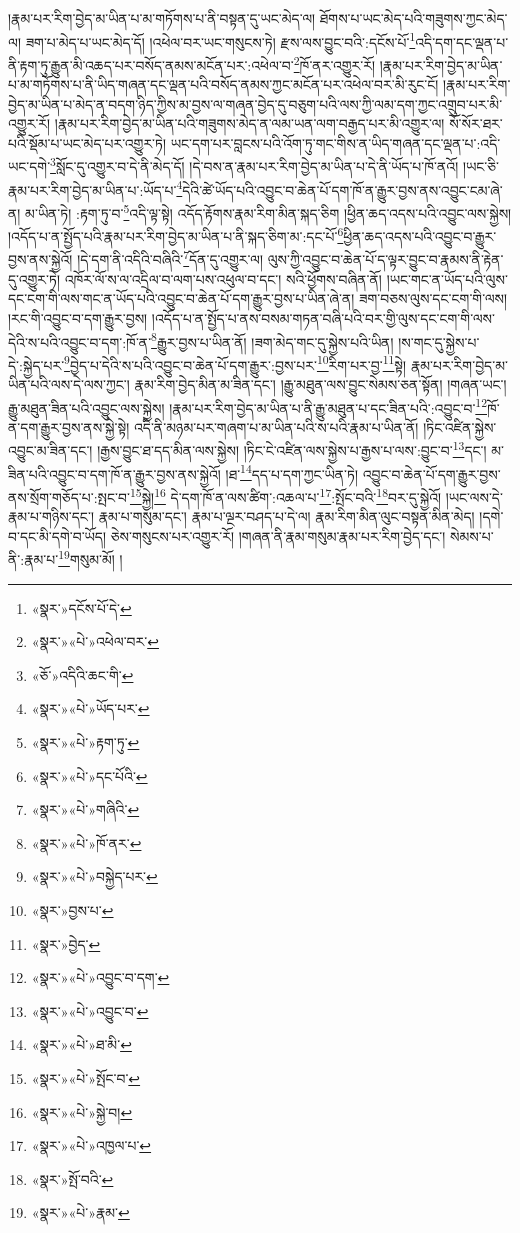 །རྣམ་པར་རིག་བྱེད་མ་ཡིན་པ་མ་གཏོགས་པ་ནི་བསྟན་དུ་ཡང་མེད་ལ། ཐོགས་པ་ཡང་མེད་པའི་གཟུགས་ཀྱང་མེད་ལ། ཟག་པ་མེད་པ་ཡང་མེད་དོ། །འཕེལ་བར་ཡང་གསུངས་ཏེ། རྫས་ལས་བྱུང་བའི་:དངོས་པོ་\footnote{«སྣར་»དངོས་པོ་དེ་}འདི་དག་དང་ལྡན་པ་ནི་རྟག་ཏུ་རྒྱུན་མི་འཆད་པར་བསོད་ནམས་མངོན་པར་:འཕེལ་བ་\footnote{«སྣར་»«པེ་»འཕེལ་བར་}ཁོ་ནར་འགྱུར་རོ། །རྣམ་པར་རིག་བྱེད་མ་ཡིན་པ་མ་གཏོགས་པ་ནི་ཡིད་གཞན་དང་ལྡན་པའི་བསོད་ནམས་ཀྱང་མངོན་པར་འཕེལ་བར་མི་རུང་ངོ། །རྣམ་པར་རིག་བྱེད་མ་ཡིན་པ་མེད་ན་བདག་ཉིད་ཀྱིས་མ་བྱས་ལ་གཞན་བྱེད་དུ་བཅུག་པའི་ལས་ཀྱི་ལམ་དག་ཀྱང་འགྲུབ་པར་མི་འགྱུར་རོ། །རྣམ་པར་རིག་བྱེད་མ་ཡིན་པའི་གཟུགས་མེད་ན་ལམ་ཡན་ལག་བརྒྱད་པར་མི་འགྱུར་ལ། སོ་སོར་ཐར་པའི་སྡོམ་པ་ཡང་མེད་པར་འགྱུར་ཏེ། ཡང་དག་པར་བླངས་པའི་འོག་ཏུ་གང་གིས་ན་ཡིད་གཞན་དང་ལྡན་པ་:འདི་ཡང་དགེ་\footnote{«ཅོ་»འདིའི་ཆང་གི་}སློང་དུ་འགྱུར་བ་དེ་ནི་མེད་དོ། །དེ་བས་ན་རྣམ་པར་རིག་བྱེད་མ་ཡིན་པ་དེ་ནི་ཡོད་པ་ཁོ་ནའོ། །ཡང་ཅི་རྣམ་པར་རིག་བྱེད་མ་ཡིན་པ་:ཡོད་པ་\footnote{«སྣར་»«པེ་»ཡོད་པར་}དེའི་ཚེ་ཡོད་པའི་འབྱུང་བ་ཆེན་པོ་དག་ཁོ་ན་རྒྱུར་བྱས་ནས་འབྱུང་ངམ་ཞེ་ན། མ་ཡིན་ཏེ། :རྟག་ཏུ་བ་\footnote{«སྣར་»«པེ་»རྟག་ཏུ་}འདི་ལྟ་སྟེ། འདོད་རྟོགས་རྣམ་རིག་མིན་སྐད་ཅིག །ཕྱིན་ཆད་འདས་པའི་འབྱུང་ལས་སྐྱེས། །འདོད་པ་ན་སྤྱོད་པའི་རྣམ་པར་རིག་བྱེད་མ་ཡིན་པ་ནི་སྐད་ཅིག་མ་:དང་པོ་\footnote{«སྣར་»«པེ་»དང་པོའི་}ཕྱིན་ཆད་འདས་པའི་འབྱུང་བ་རྒྱུར་བྱས་ནས་སྐྱེའོ། །དེ་དག་ནི་འདིའི་བཞིའི་\footnote{«སྣར་»«པེ་»གཞིའི་}དོན་དུ་འགྱུར་ལ། ལུས་ཀྱི་འབྱུང་བ་ཆེན་པོ་ད་ལྟར་བྱུང་བ་རྣམས་ནི་རྟེན་དུ་འགྱུར་ཏེ། འཁོར་ལོ་ས་ལ་འདྲིལ་བ་ལག་པས་འཕུལ་བ་དང་། སའི་ཕྱོགས་བཞིན་ནོ། །ཡང་གང་ན་ཡོད་པའི་ལུས་དང་ངག་གི་ལས་གང་ན་ཡོད་པའི་འབྱུང་བ་ཆེན་པོ་དག་རྒྱུར་བྱས་པ་ཡིན་ཞེ་ན། ཟག་བཅས་ལུས་དང་ངག་གི་ལས། །རང་གི་འབྱུང་བ་དག་རྒྱུར་བྱས། །འདོད་པ་ན་སྤྱོད་པ་ནས་བསམ་གཏན་བཞི་པའི་བར་གྱི་ལུས་དང་ངག་གི་ལས་དེའི་ས་པའི་འབྱུང་བ་དག་:ཁོ་ན་\footnote{«སྣར་»«པེ་»ཁོ་ནར་}རྒྱུར་བྱས་པ་ཡིན་ནོ། །ཟག་མེད་གང་དུ་སྐྱེས་པའི་ཡིན། །ས་གང་དུ་སྐྱེས་པ་དེ་:སྐྱེད་པར་\footnote{«སྣར་»«པེ་»བསྐྱེད་པར་}བྱེད་པ་དེའི་ས་པའི་འབྱུང་བ་ཆེན་པོ་དག་རྒྱུར་:བྱས་པར་\footnote{«སྣར་»བྱས་པ་}རིག་པར་བྱ་\footnote{«སྣར་»བྱེད་}སྟེ། རྣམ་པར་རིག་བྱེད་མ་ཡིན་པའི་ལས་དེ་ལས་ཀྱང་། རྣམ་རིག་བྱེད་མིན་མ་ཟིན་དང་། །རྒྱུ་མཐུན་ལས་བྱུང་སེམས་ཅན་སྟོན། །གཞན་ཡང་། རྒྱུ་མཐུན་ཟིན་པའི་འབྱུང་ལས་སྐྱེས། །རྣམ་པར་རིག་བྱེད་མ་ཡིན་པ་ནི་རྒྱུ་མཐུན་པ་དང་ཟིན་པའི་:འབྱུང་བ་\footnote{«སྣར་»«པེ་»འབྱུང་བ་དག་}ཁོ་ན་དག་རྒྱུར་བྱས་ནས་སྐྱེ་སྟེ། འདི་ནི་མཉམ་པར་གཞག་པ་མ་ཡིན་པའི་ས་པའི་རྣམ་པ་ཡིན་ནོ། །ཏིང་འཛིན་སྐྱེས་འབྱུང་མ་ཟིན་དང་། །རྒྱས་བྱུང་ཐ་དད་མིན་ལས་སྐྱེས། །ཏིང་ངེ་འཛིན་ལས་སྐྱེས་པ་རྒྱས་པ་ལས་:བྱུང་བ་\footnote{«སྣར་»«པེ་»འབྱུང་བ་}དང་། མ་ཟིན་པའི་འབྱུང་བ་དག་ཁོ་ན་རྒྱུར་བྱས་ནས་སྐྱེའོ། །ཐ་\footnote{«སྣར་»«པེ་»ཐ་མི་}དད་པ་དག་ཀྱང་ཡིན་ཏེ། འབྱུང་བ་ཆེན་པོ་དག་རྒྱུར་བྱས་ནས་སྲོག་གཅོད་པ་:སྤང་བ་\footnote{«སྣར་»«པེ་»སྤོང་བ་}སྐྱེ།\footnote{«སྣར་»«པེ་»སྐྱེ་བ།} དེ་དག་ཁོ་ན་ལས་ཚིག་:འཆལ་པ་\footnote{«སྣར་»«པེ་»འཁྱལ་པ་}:སྤོང་བའི་\footnote{«སྣར་»སྤོ་བའི་}བར་དུ་སྐྱེའོ། །ཡང་ལས་དེ་རྣམ་པ་གཉིས་དང་། རྣམ་པ་གསུམ་དང་། རྣམ་པ་ལྔར་བཤད་པ་དེ་ལ། རྣམ་རིག་མིན་ལུང་བསྟན་མིན་མེད། །དགེ་བ་དང་མི་དགེ་བ་ཡོད། ཅེས་གསུངས་པར་འགྱུར་རོ། །གཞན་ནི་རྣམ་གསུམ་རྣམ་པར་རིག་བྱེད་དང་། སེམས་པ་ནི་:རྣམ་པ་\footnote{«སྣར་»«པེ་»རྣམ་}གསུམ་མོ། །
